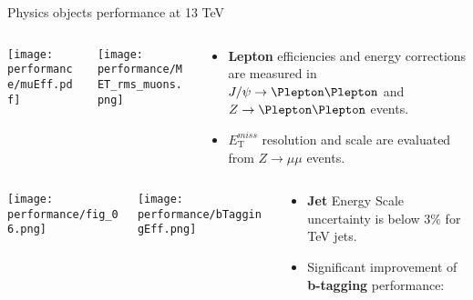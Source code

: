 \documentclass[8pt]{beamer}
\begin{document}
\begin{frame}{\large Physics objects performance at 13 TeV}

 \begin{columns}
  \begin{column}{4cm}
   \texttt{[image: performance/muEff.pdf]}\\
  \end{column}
  \begin{column}{4cm}
   \texttt{[image: performance/MET\_rms\_muons.png]}\\
  \end{column}
  \begin{column}{4cm}
   \begin{itemize}
    \item \textbf{Lepton} efficiencies and energy corrections are measured in $J/\psi \to \Plepton\Plepton$
    and $Z \to \Plepton\Plepton$ events.
    \item \textbf{$E_\mathrm{T}^{miss}$} resolution and scale are evaluated from $Z\to \mu\mu$ events.
   \end{itemize}
  \end{column}
 \end{columns}

 \vspace{0.5cm}
 
 \begin{columns}
  \begin{column}{4cm}
   \texttt{[image: performance/fig\_06.png]}\\
  \end{column}
  \begin{column}{4cm}
   \texttt{[image: performance/bTaggingEff.png]}\\
  \end{column}
  \begin{column}{4cm}
   \begin{itemize}
    \item \textbf{Jet} Energy Scale uncertainty is below 3$\%$ for TeV jets.
    \item Significant improvement of \textbf{b-tagging} performance:


\end{itemize}
\end{column}
\end{columns}
\end{frame}
\end{document}
